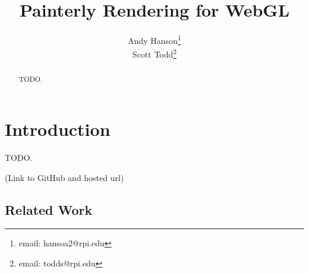 \documentclass[conference]{acmsiggraph}
\title{Painterly Rendering for WebGL}
\author{Andy Hanson\thanks{email: hansoa2@rpi.edu}\\
        Scott Todd\thanks{email: todds@rpi.edu}}
\begin{document}

\maketitle

\begin{abstract}

TODO.

\end{abstract}



\keywordlist


\TOGlinkslist


\copyrightspace

\section{Introduction}

TODO.

(Link to GitHub and hosted url)


\subsection{Related Work}
\end{document}
